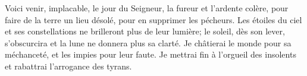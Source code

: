 Voici venir, implacable, le jour du Seigneur, la fureur et l’ardente colère,
	pour faire de la terre un lieu désolé, pour en supprimer les pécheurs.
Les étoiles du ciel et ses constellations ne brilleront plus de leur lumière;
	le soleil, dès son lever, s’obscurcira et la lune ne donnera plus sa clarté.
Je châtierai le monde pour sa méchanceté, et les impies pour leur faute.
	Je mettrai fin à l’orgueil des insolents et rabattrai l’arrogance des tyrans.
